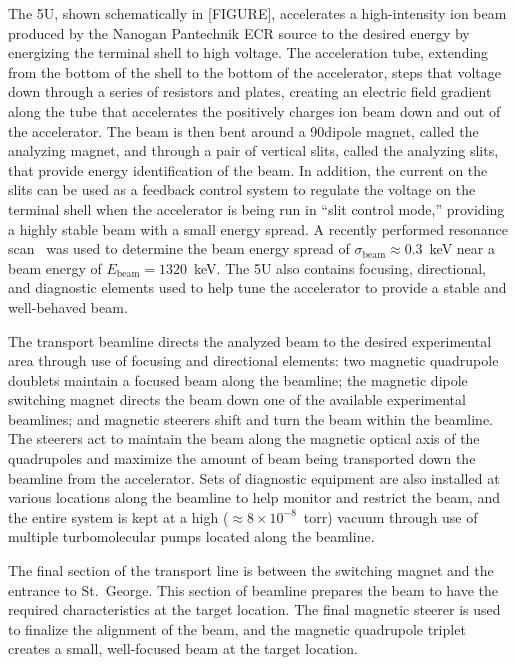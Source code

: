 The 5U, shown schematically in [FIGURE], accelerates a high-intensity ion beam
produced by the Nanogan Pantechnik ECR source to the desired energy by
energizing the
terminal shell to high voltage. The acceleration tube, extending from the
bottom of the shell to the bottom of the accelerator, steps that voltage down
through a series of resistors and plates, creating an electric field gradient
along the tube that accelerates the positively charges ion beam down and out of
the accelerator. The beam is then bent around a 90\degree dipole magnet, called
the analyzing magnet, and through a pair of vertical slits, called the
analyzing slits, that provide energy identification of the beam.
In addition, the
current on the slits can be used as a feedback control system to regulate the
voltage on the terminal shell when the accelerator is being run in ``slit
control mode,'' providing a highly stable beam with a small energy spread.
A recently performed 
resonance scan~\cite{Gilardy2017} was used to determine the beam energy spread
of $\sigma_{\textrm{beam}} \approx 0.3$~keV near a beam energy of
$E_{\textrm{beam}} = 1320$~keV. The 5U also contains
focusing, directional, and diagnostic elements used to help tune the accelerator
to provide a stable and well-behaved beam.

The transport beamline directs the analyzed beam to the desired
experimental area through use of focusing and directional elements: two
magnetic
quadrupole doublets maintain a focused beam along the beamline; the magnetic
dipole switching magnet
directs the beam down one of the available experimental beamlines; and magnetic
steerers shift and turn the beam within the beamline. The steerers act to
maintain the beam along
the magnetic optical axis of the quadrupoles and maximize the amount of beam
being transported down the beamline from
the accelerator. Sets of diagnostic equipment are also installed at various
locations along the beamline to help monitor and restrict the beam, and the
entire system is kept at a high ($\approx 8\times 10^{-8}$~torr) vacuum through
use of multiple turbomolecular pumps located along the beamline.

The final section of the transport line is between the switching magnet
and the entrance to St.\ George.
This section of beamline prepares the beam to have the required characteristics
at the target location. The final magnetic steerer is used to finalize the
alignment of the beam, and the magnetic quadrupole triplet creates a small,
well-focused beam at the target location.


